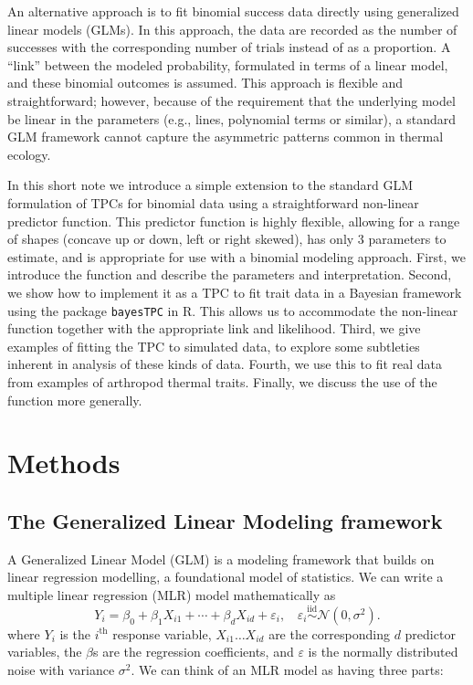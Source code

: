 \documentclass[
  12pt,
]{article}
\begin{document}
An alternative approach is to fit binomial success data directly using
generalized linear models (GLMs). In this approach, the data are
recorded as the number of successes with the corresponding number of
trials instead of as a proportion. A ``link'' between the modeled
probability, formulated in terms of a linear model, and these binomial
outcomes is assumed. This approach is flexible and straightforward;
however, because of the requirement that the underlying model be linear
in the parameters (e.g., lines, polynomial terms or similar), a standard
GLM framework cannot capture the asymmetric patterns common in thermal
ecology.

In this short note we introduce a simple extension to the standard GLM
formulation of TPCs for binomial data using a straightforward non-linear
predictor function. This predictor function is highly flexible, allowing
for a range of shapes (concave up or down, left or right skewed), has
only 3 parameters to estimate, and is appropriate for use with a
binomial modeling approach. First, we introduce the function and
describe the parameters and interpretation. Second, we show how to
implement it as a TPC to fit trait data in a Bayesian framework using
the package \texttt{bayesTPC} in R. This allows us to accommodate the
non-linear function together with the appropriate link and likelihood.
Third, we give examples of fitting the TPC to simulated data, to explore
some subtleties inherent in analysis of these kinds of data. Fourth, we
use this to fit real data from examples of arthropod thermal traits.
Finally, we discuss the use of the function more generally.

\section{Methods}\label{methods}

\subsection{The Generalized Linear Modeling
framework}\label{the-generalized-linear-modeling-framework}

A Generalized Linear Model (GLM) is a modeling framework that builds on
linear regression modelling, a foundational model of statistics. We can
write a multiple linear regression (MLR) model mathematically as \[
Y_i   = \beta_0 + \beta_1 X_{i1} + \cdots
+ \beta_d X_{id}  + \varepsilon_i, ~~~~  \varepsilon_i \stackrel{\mathrm{iid}}{\sim} \mathcal{N}(0, \sigma^2).
\] where \(Y_i\) is the \(i^{\mathrm{th}}\) response variable,
\(X_{i1} \dots X_{id}\) are the corresponding \(d\) predictor variables,
the \(\beta\)s are the regression coefficients, and \(\varepsilon\) is
the normally distributed noise with variance \(\sigma^2\). We can think
of an MLR model as having three parts:
\end{document}

